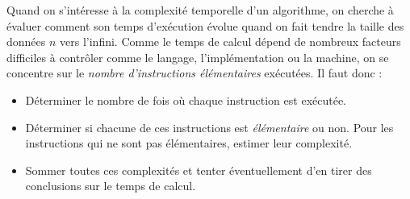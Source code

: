 \documentclass{magnolia}
\begin{document}

Quand on s'intéresse à la complexité temporelle d'un algorithme, on
cherche à évaluer comment son temps d'exécution évolue quand on
fait tendre la taille des données $n$ vers l'infini. Comme le temps
de calcul dépend de nombreux facteurs difficiles à contrôler
comme le langage, l'implémentation ou la machine,  on se concentre
sur le \emph{nombre d'instructions élémentaires} exécutées.
Il faut donc :
\begin{itemize}
  \item Déterminer le nombre de fois où
  chaque instruction est exécutée.
  \item Déterminer si chacune de ces instructions est \emph{élémentaire}
  ou non. Pour les instructions qui ne sont pas élémentaires, estimer leur
  complexité.
  \item Sommer toutes ces complexités et tenter éventuellement d'en tirer des conclusions sur le temps
  de calcul.
\end{itemize}

\end{document}
